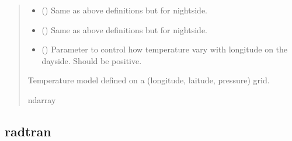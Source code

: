 \documentclass[letterpaper,10pt,english]{sphinxmanual}
\begin{document}
\begin{fulllineitems}
\begin{quote}
\begin{description}
\begin{itemize}
\item {} 
\sphinxAtStartPar
{} () \textendash{} Same as above definitions but for nightside.

\item {} 
\sphinxAtStartPar
{} () \textendash{} Same as above definitions but for nightside.

\item {} 
\sphinxAtStartPar
{} () \textendash{} Parameter to control how temperature vary with longitude on the dayside.
Should be positive.

\end{itemize}

\sphinxAtStartPar
{} \textendash{} Temperature model defined on a (longitude, laitude, pressure) grid.

\sphinxAtStartPar
ndarray

\end{description}\end{quote}

\end{fulllineitems}



\subsection{radtran}
\label{\detokenize{api:radtran}}
\end{document}
